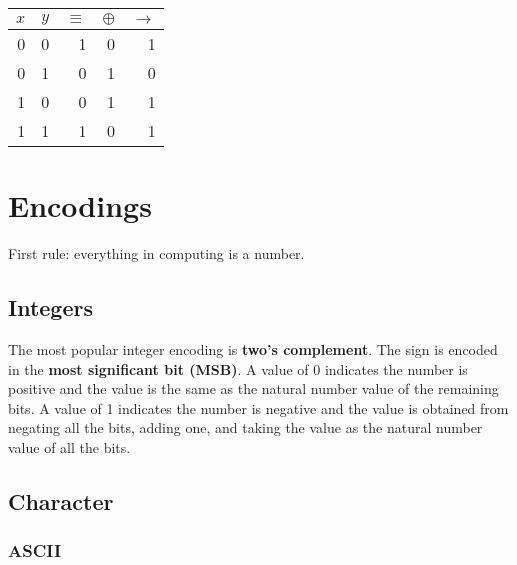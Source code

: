 \documentclass[12pt]{book}
\begin{document}
  \begin{center}
    \begin{tabular}{r r | r | r | r}
      $x$ & $y$ & $\equiv$ & $\oplus$ & $\to$ \\
      \hline
        0 &   0 &        1 &        0 &     1 \\
        0 &   1 &        0 &        1 &     0 \\
        1 &   0 &        0 &        1 &     1 \\
        1 &   1 &        1 &        0 &     1 \\
    \end{tabular}
  \end{center}

  \chapter{Encodings}

  First rule: everything in computing is a number.

  \section{Integers}

  The most popular integer encoding is \textbf{two's complement}. The sign is
  encoded in the \textbf{most significant bit (MSB)}. A value of 0 indicates the
  number is positive and the value is the same as the natural number value of
  the remaining bits. A value of 1 indicates the number is negative and the
  value is obtained from negating all the bits, adding one, and taking the value
  as the natural number value of all the bits.

  \newpage
  \section{Character}

  \subsection{ASCII}
\end{document}
